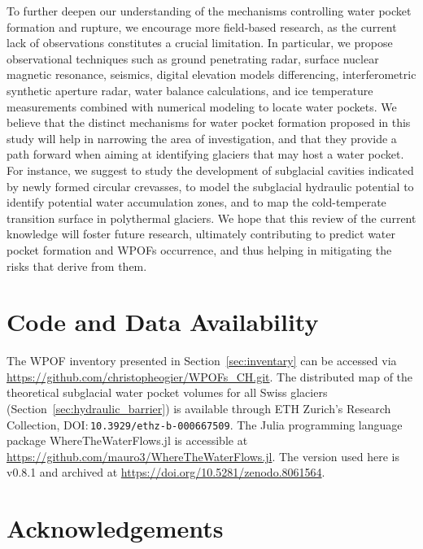 To further deepen our understanding of the mechanisms controlling water pocket formation and rupture, we encourage more field-based research, as the current lack of observations constitutes a crucial limitation. In particular, we propose observational techniques such as ground penetrating radar, surface nuclear magnetic resonance, seismics, digital elevation models differencing, interferometric synthetic aperture radar, water balance calculations, and ice temperature measurements combined with numerical modeling to locate water pockets. We believe that the distinct mechanisms for water pocket formation proposed in this study will help in narrowing the area of investigation, and that they provide a path forward when aiming at identifying glaciers that may host a water pocket. For instance, we suggest to study the development of subglacial cavities indicated by newly formed circular crevasses, to model the subglacial hydraulic potential to identify potential water accumulation zones, and to map the cold-temperate transition surface in polythermal glaciers. We hope that this review of the current knowledge will foster future research, ultimately contributing to predict water pocket formation and WPOFs occurrence, and thus helping in mitigating the risks that derive from them.

\section{ Code and Data Availability}

The WPOF inventory presented in Section~\ref{sec:inventary} can be accessed via \url{https://github.com/christopheogier/WPOFs_CH.git}. The distributed map of the theoretical subglacial water pocket volumes for all Swiss glaciers (Section~\ref{sec:hydraulic_barrier}) is available through ETH Zurich's Research Collection, DOI:\,\texttt{10.3929/ethz-b-000667509}. The Julia programming language package WhereTheWaterFlows.jl is accessible at \url{https://github.com/mauro3/WhereTheWaterFlows.jl}. The version used here is v0.8.1 and archived at \url{https://doi.org/10.5281/zenodo.8061564}.\\

\section{ Acknowledgements} 

